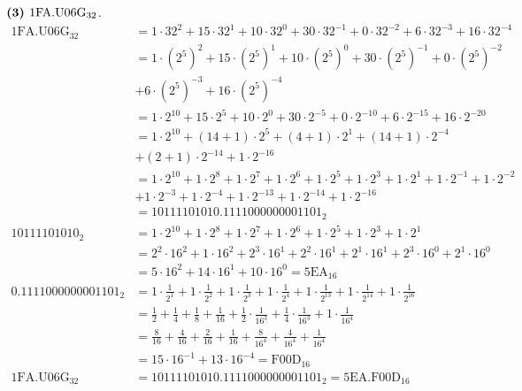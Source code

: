 \documentclass[11pt]{article}
\begin{document}
\noindent $\textbf{(3) } \space 1\text{FA.U06G}_{32}$.
\begin{equation}
    \begin{split}
    1\text{FA.U06G}_{32} &= 1 \cdot 32^2 + 15 \cdot 32^1 + 10 \cdot 32^0 + 30 \cdot 32^{-1} + 0 \cdot 32^{-2} + 6 \cdot 32^{-3} + 16 \cdot 32^{-4}\\ 
    &= 1 \cdot (2^5)^2 + 15 \cdot (2^5)^1 + 10 \cdot (2^5)^0 + 30 \cdot (2^5)^{-1} + 0 \cdot (2^5)^{-2}\\
    & + 6 \cdot (2^5)^{-3} + 16 \cdot (2^5)^{-4}\\ 
    &= 1 \cdot 2^{10} + 15 \cdot 2^5 + 10 \cdot 2^0 + 30 \cdot 2^{-5} + 0 \cdot 2^{-10} + 6 \cdot 2^{-15} + 16 \cdot 2^{-20}\\ 
    &= 1 \cdot 2^{10} + (14 + 1) \cdot 2^5 + (4 + 1) \cdot 2^1 + (14 + 1) \cdot 2^{-4} \\
    & + (2 + 1) \cdot 2^{-14} + 1 \cdot 2^{-16}\\ 
    &= 1 \cdot 2^{10} + 1 \cdot 2^8 + 1 \cdot 2^7 + 1 \cdot 2^6 + 1 \cdot 2^5 + 1 \cdot 2^3 + 1 \cdot 2^1 + 1 \cdot 2^{-1} + 1 \cdot 2^{-2}\\ 
    & + 1 \cdot 2^{-3} + 1 \cdot 2^{-4} + 1 \cdot 2^{-13} + 1 \cdot 2^{-14} + 1 \cdot
    2^{-16}\\ 
    &= 10111101010.1111000000001101_2 \\
    10111101010_2 &= 1 \cdot 2^{10} + 1 \cdot 2^8 + 1 \cdot 2^7 + 1 \cdot 2^6 + 1 \cdot 2^5 + 1 \cdot 2^3 + 1 \cdot 2^1\\
    &= 2^2 \cdot 16^2 + 1 \cdot 16^2 + 2^3 \cdot 16^1 + 2^2 \cdot 16^1 + 2^1 \cdot 16^1 + 2^3 \cdot 16^0 + 2^1 \cdot 16^0\\
    &= 5 \cdot 16^2 + 14 \cdot 16^1 + 10 \cdot 16^0 = \text{5EA}_{16}\\
    0.1111000000001101_2 &= 1 \cdot \frac{1}{2^{1}} + 1 \cdot \frac{1}{2^{2}} + 1 \cdot \frac{1}{2^{3}} + 1 \cdot \frac{1}{2^{4}} + 1 \cdot \frac{1}{2^{13}} + 1 \cdot \frac{1}{2^{14}} + 1 \cdot
    \frac{1}{2^{16}}\\
    &= \frac{1}{2} + \frac{1}{4} + \frac{1}{8} + \frac{1}{16} + \frac{1}{2}  \cdot \frac{1}{16^3} + \frac{1}{4} \cdot \frac{1}{16^3} + 1 \cdot \frac{1}{16^4}\\
    &= \frac{8}{16} + \frac{4}{16} + \frac{2}{16} + \frac{1}{16} + \frac{8}{16^4} + \frac{4}{16^4} + \frac{1}{16^4}\\
    &= 15 \cdot 16^{-1} + 13 \cdot 16^{-4} = \text{F00D}_16 \\
    1\text{FA.U06G}_{32} &= 10111101010.1111000000001101_2 = \text{5EA.F00D}_{16}
    \end{split}
\end{equation}
\end{document}
